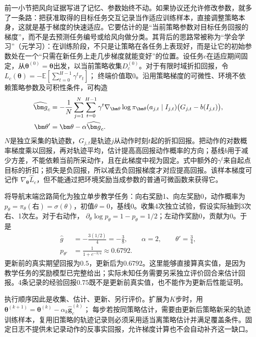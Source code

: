 前一小节把风向证据写进了记忆、参数始终不动。如果协议还允许修改参数，就多了一条路：把获准取得的目标任务交互记录当作适应训练样本，直接调整策略本身，这就是基于梯度的快速适应。它要估计的是“当前策略参数对目标任务回报的梯度”，而不是去预测任务编号或给风向做分类。其背后的思路常被称为“学会学习”（元学习）：在训练阶段，不只是让策略在各任务上表现好，而是让它的初始参数处在一个“只需在新任务上走几步梯度就能变好”的位置。设任务$c$在适应期间固定，从$\bm\theta^{(0)}=\bm\theta$出发，以当前策略收集$D_c^{(0)}$。对于有限时域折扣回报，令
$L_c(\bm\theta)=-\mathbb E[\sum_{t=0}^{H-1}\gamma^t r_t]$；
终端价值取0。沿用策略梯度的可微性、环境不依赖策略参数及可积性条件，可构造
\begin{align}
 \widehat{\bm g}_c
 &=-\frac1N\sum_{j=1}^N\sum_{t=0}^{H-1}
   \gamma^t\nabla_{\bm\theta}\log\pi_{\bm\theta}
        (a_{j,t}\mid I_{j,t})
   \bigl(G_{j,t}-b(I_{j,t})\bigr),\notag\\
 \bm\theta'&=\bm\theta-\alpha\widehat{\bm g}_c.
 \label{eq:rl-transfer-inner-update}
\end{align}
$N$是独立采集的轨迹数，$G_{j,t}$是轨迹$j$从动作时刻$t$起的折扣回报。把动作的对数概率梯度乘以回报，再对轨迹平均，估计提高高回报动作概率的方向；基线$b$用于减少方差，不能依赖当前所采动作，且在此梯度中视为固定。式中额外的$\gamma^t$来自起点目标的折扣；损失是负回报，所以减去负回报梯度才对应提高回报。该样本梯度可记作
$\nabla_{\bm\theta}\widehat L_c$，但不能通过把环境奖励当成参数的普通可微函数来获得它。

\begin{example}[一次目标任务参数更新]
 \label{ex:rl-transfer-gradient-step}
 将导航末端岔路简化为独立单步教学任务：向右奖励1、向左奖励0，动作概率为
 $p_\theta=\pi_\theta(\text{右})=\sigma(\theta)$，初值$\theta=0$，基线0。收集4次独立试验，假设实际抽到3次右、1次左。对于右动作，
 $\partial_\theta\log p_\theta=1-p_\theta=1/2$；左动作奖励0，贡献为0。于是
 \[
 \begin{aligned}
 \widehat g&=-\frac{3(1/2)}4=-\frac38,\qquad
 \alpha=2,\qquad \theta'=\frac34,\\
 p_{\theta'}&=\frac1{1+e^{-3/4}}\approx0.6792.
 \end{aligned}
 \]
 更新前的真实期望回报为$0.5$，更新后为$0.6792$。这里能够直接算真实值，是因为教学任务的奖励模型已完整给出；实际未知任务需要另采独立评价回合来估计回报。4条记录的经验回报$0.75$既不是更新前真实值，也不能作为更新后性能证明。
\end{example}

执行顺序因此是收集、估计、更新、另行评价。扩展为$K$步时，用
$\bm\theta^{(k+1)}=\bm\theta^{(k)}-\alpha_k\widehat{\bm g}_c^{(k)}$；
每步若按同策略估计，需要由更新后策略新采的轨迹训练样本，复用旧策略的轨迹记录则必须采用适当离策略估计并满足覆盖条件。固定日志不提供未记录动作的反事实回报，允许梯度计算也不会自动补齐这一缺口。

